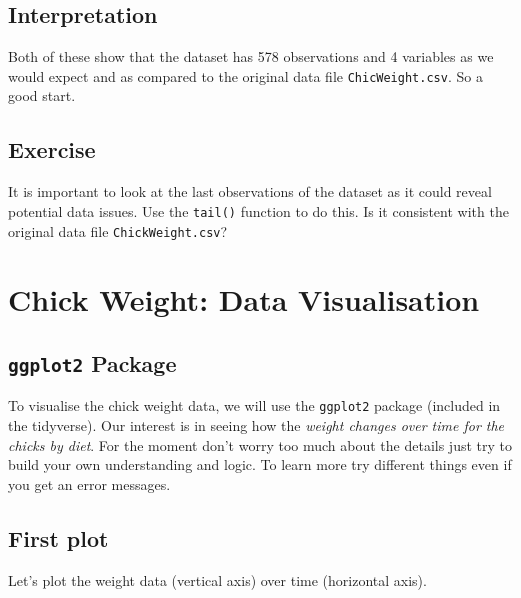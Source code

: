 \documentclass[a4paper,9pt,twocolumn,twoside,printwatermark=false]{pinp}
\begin{document}
\subsection{Interpretation}\label{interpretation}

Both of these show that the dataset has 578 observations and 4 variables
as we would expect and as compared to the original data file
\texttt{ChicWeight.csv}. So a good start.

\subsection{Exercise}\label{exercise-2}

It is important to look at the last observations of the dataset as it
could reveal potential data issues. Use the \texttt{tail()} function to
do this. Is it consistent with the original data file
\texttt{ChickWeight.csv}?

\section{Chick Weight: Data
Visualisation}\label{chick-weight-data-visualisation}

\subsection{\texorpdfstring{\texttt{ggplot2}
Package}{ggplot2 Package}}\label{ggplot2-package}

To visualise the chick weight data, we will use the \texttt{ggplot2}
package (included in the tidyverse). Our interest is in seeing how the
\emph{weight changes over time for the chicks by diet}. For the moment
don't worry too much about the details just try to build your own
understanding and logic. To learn more try different things even if you
get an error messages.

\subsection{First plot}\label{first-plot}

Let's plot the weight data (vertical axis) over time (horizontal axis).

\begin{Shaded}
\begin{Highlighting}[]
\OperatorTok{+}\StringTok{ }\NormalTok{() }
\end{Highlighting}
\end{Shaded}
\end{document}
